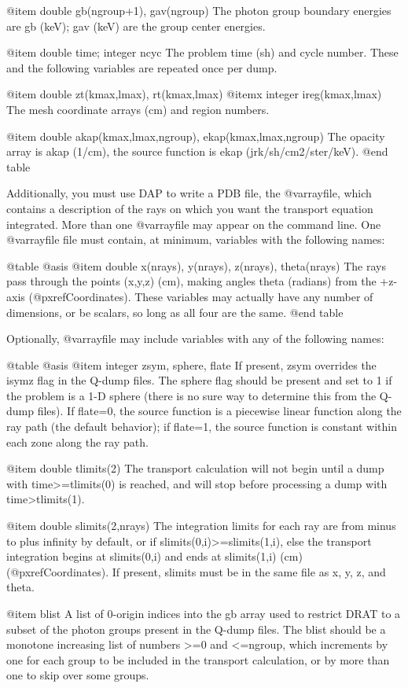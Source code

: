 @item double gb(ngroup+1), gav(ngroup)
The photon group boundary energies are gb (keV);
gav (keV) are the group center energies.

@item double time; integer ncyc
The problem time (sh) and cycle number.  These and the following
variables are repeated once per dump.

@item double zt(kmax,lmax), rt(kmax,lmax)
@itemx integer ireg(kmax,lmax)
The mesh coordinate arrays (cm) and region numbers.

@item double akap(kmax,lmax,ngroup), ekap(kmax,lmax,ngroup)
The opacity array is akap (1/cm), the source function is
ekap (jrk/sh/cm2/ster/keV).
@end table

Additionally, you must use DAP to write a PDB file, the @var{rayfile},
which contains a description of the rays on which you want the transport
equation integrated.  More than one @var{rayfile} may appear on the
command line.  One @var{rayfile} file must contain, at minimum,
variables with the following names:

@table @asis
@item double x(nrays), y(nrays), z(nrays), theta(nrays)
The rays pass through the points (x,y,z) (cm), making angles
theta (radians) from the +z-axis (@pxref{Coordinates}).
These variables may actually have any number of dimensions,
or be scalars, so long as all four are the same.
@end table

Optionally, @var{rayfile} may include variables with any of the following
names:

@table @asis
@item integer zsym, sphere, flate
If present, zsym overrides the isymz flag in the Q-dump files.
The sphere flag should be present and set to 1 if the problem
is a 1-D sphere (there is no sure way to determine this from
the Q-dump files).  If flate=0, the source function is a
piecewise linear function along the ray path (the default
behavior); if flate=1, the source function is constant within
each zone along the ray path.

@item double tlimits(2)
The transport calculation will not begin until a dump with
time>=tlimits(0) is reached, and will stop before processing
a dump with time>tlimits(1).

@item double slimits(2,nrays)
The integration limits for each ray are from minus to plus
infinity by default, or if slimits(0,i)>=slimits(1,i), else
the transport integration begins at slimits(0,i) and ends
at slimits(1,i) (cm) (@pxref{Coordinates}).  If present,
slimits must be in the same file as x, y, z, and theta.

@item blist
A list of 0-origin indices into the gb array used to restrict
DRAT to a subset of the photon groups present in the Q-dump
files.  The blist should be a monotone increasing list of
numbers >=0 and <=ngroup, which increments by one for each
group to be included in the transport calculation, or by
more than one to skip over some groups.

